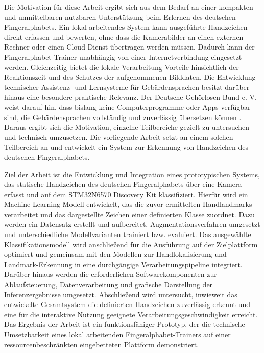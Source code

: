 Die Motivation für diese Arbeit ergibt sich aus dem Bedarf an einer kompakten und unmittelbaren nutzbaren Unterstützung beim Erlernen des deutschen Fingeralphabets. Ein lokal arbeitendes System kann ausgeführte Handzeichen direkt erfassen und bewerten, ohne dass die Kamerabilder an einen externen Rechner oder einen Cloud-Dienst übertragen werden müssen. Dadurch kann der Fingeralphabet-Trainer unabhängig von einer Internetverbindung eingesetzt werden. Gleichzeitig bietet die lokale Verarbeitung Vorteile hinsichtlich der Reaktionszeit und des Schutzes der aufgenommenen Bilddaten. Die Entwicklung technischer Assistenz- und Lernsysteme für Gebärdensprachen besitzt darüber hinaus eine besondere praktische Relevanz. Der Deutsche Gehörlosen-Bund e. V. weist darauf hin, dass bislang keine Computerprogramme oder Apps verfügbar sind, die Gebärdensprachen vollständig und zuverlässig übersetzen können \cite{DeutscheGebaerdensprache}. Daraus ergibt sich die Motivation, einzelne Teilbereiche gezielt zu untersuchen und technisch umzusetzen. Die vorliegende Arbeit setzt an einem solchen Teilbereich an und entwickelt ein System zur Erkennung von Handzeichen des deutschen Fingeralphabets.

Ziel der Arbeit ist die Entwicklung und Integration eines prototypischen Systems, das statische Handzeichen des deutschen Fingeralphabets über eine Kamera erfasst und auf dem STM32N6570 Discovery Kit klassifiziert. Hierfür wird ein Machine-Learning-Modell entwickelt, das die zuvor ermittelten Handlandmarks verarbeitet und das dargestellte Zeichen einer definierten Klasse zuordnet. Dazu werden ein Datensatz erstellt und aufbereitet, Augmentationsverfahren umgesetzt und unterschiedliche Modellvarianten trainiert bzw. evaluiert. Das ausgewählte Klassifikationsmodell wird anschließend für die Ausführung auf der Zielplattform optimiert und gemeinsam mit den Modellen zur Handlokalisierung und Landmark-Erkennung in eine durchgängige Verarbeitungspipeline integriert. Darüber hinaus werden die erforderlichen Softwarekomponenten zur Ablaufsteuerung, Datenverarbeitung und grafische Darstellung der Inferenzergebnisse umgesetzt. Abschließend wird untersucht, inwieweit das entwickelte Gesamtsystem die definierten Handzeichen zuverlässig erkennt und eine für die interaktive Nutzung geeignete Verarbeitungsgeschwindigkeit erreicht. Das Ergebnis der Arbeit ist ein funktionsfähiger Prototyp, der die technische Umsetzbarkeit eines lokal arbeitenden Fingeralphabet-Trainers auf einer ressourcenbeschränkten eingebetteten Plattform demonstriert.

